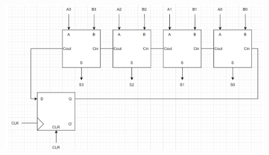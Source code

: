 \documentclass{article}
\begin{document}
\begin{enumerate}[label=\alph*.]
    \begin{figure}[!h]
        \centering
        \includegraphics[width=1.1\textwidth]{figures/serial1e_solution.png}
    \end{figure}
\end{enumerate}
\end{document}
